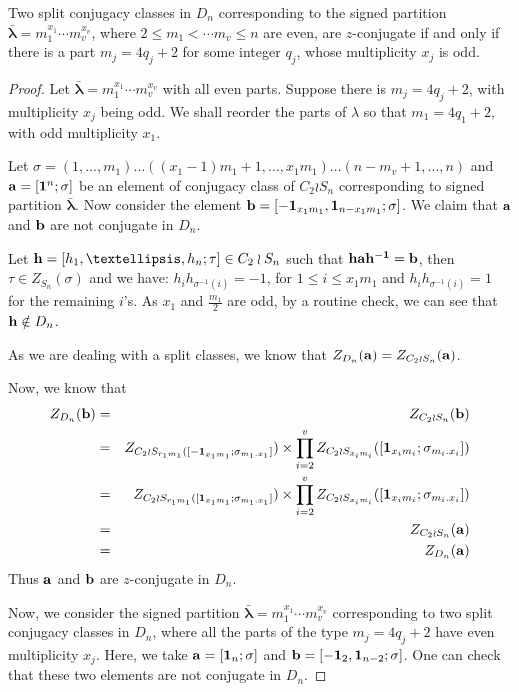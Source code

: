 \documentclass[10pt,a4paper]{amsart}
\newcommand{\bmf}[1]{\mathbf{#1}}
\newcommand{\lbd}{\lambda}
\begin{document}
\begin{theorem}\label{Th_split_CC_in_D_n}
Two split conjugacy classes in $D_n$ corresponding to the signed partition $\bmf{\bar{\lambda}} = m_1^{x_1}\cdots m_v^{x_v}$, where $2\leq m_1 < \cdots m_v\leq n$ are even, are $z$-conjugate if and only if there is a part $m_j = 4q_j + 2$ for some integer $q_j$, whose multiplicity $x_j$ is odd.
\end{theorem}

\begin{proof}
 Let $ \bmf{\bar{\lambda}}=m_1^{x_1}\cdots m_v^{x_v}$ with all even parts. Suppose there is $m_j = 4q_j + 2$, with multiplicity $x_j$ being odd. We shall reorder the parts of $\lbd$ so that $m_1 = 4q_1 + 2$, with odd multiplicity $x_1$. 

Let $\sigma = (1, \dots, m_1)\dots((x_1-1)m_1+1,\dots,x_1m_1)\dots(n-m_v+1,\dots,n)$
 and ${\bf a} = [{\bf 1}^n; \sigma]$ be an element of conjugacy class of $C_2 \wr S_n$ corresponding to signed partition $\bmf{\bar{\lambda}}.$
 Now consider the element ${\bf b} = [\bmf{-1}_{x_1m_1},\bmf{1}_{n-x_1m_1}; \sigma]$. We claim that ${\bf a}$ and ${\bf b}$ are not conjugate in $D_n.$ 

 
 Let ${\bf h} = [h_1,\ldots, h_n; \tau] \in C_2\wr S_n$ such that ${\bf hah^{-1}} = {\bf b}$, then $\tau \in Z_{S_n}(\sigma)$ and we have: $h_i h_{\sigma^{-1}(i)} = -1$, for $1 \leq i \leq x_1m_1$ and $h_ih_{\sigma^{-1}(i)} = 1$ for the remaining $i$'s. As $x_1$ and $\frac{m_1}{2}$ are odd, by a routine check, we can see that ${\bf h} \notin D_n$.

 As we are dealing with a split classes, we know that ${Z}_{D_n}({\bf a}) = {Z}_{C_2\wr S_n} ({\bf a})$. 

 Now, we know that 
 \begin{eqnarray*}
{Z}_{D_n}({\bf b}) &=& {Z}_{C_2 \wr S_n}({\bf b}) \\
&=& {Z}_{C_2\wr S_{r_1m_1}([{\bf -1}_{x_1m_1}; \sigma_{m_1.x_1}]}) \times \prod_{i = 2}^v {Z}_{C_2 \wr S_{x_im_i}}
([{\bf 1}_{x_im_i}; \sigma_{m_i.x_i}])\\
&=& {Z}_{C_2\wr S_{r_1m_1}([{\bf 1}_{x_1m_1}; \sigma_{m_1.x_1}]}) \times \prod_{i = 2}^v {Z}_{C_2 \wr S_{x_im_i}}
([{\bf 1}_{x_im_i}; \sigma_{m_i.x_i}])\\
&=& {Z}_{C_2 \wr S_n}({\bf a}) \\
&=& {Z}_{D_n}({\bf a})
\end{eqnarray*}
Thus ${\bf a}$ and ${\bf b}$ are $z$-conjugate in $D_n$.

Now, we consider the signed partition $\bmf{\bar{\lambda}} =m_1^{x_1}\cdots m_v^{x_v}$ corresponding to two split conjugacy classes in $D_n$, where all the parts of the type $m_j = 4q_j + 2$ have even multiplicity $x_j$. Here, we take ${\bf a} = [{\bf 1}_n; \sigma]$ and ${\bf b} = [{\bf -1}_2, {\bf 1}_{n-2}; \sigma]$. One can check that these two elements are not conjugate in $D_n.$


\end{proof}
\end{document}
